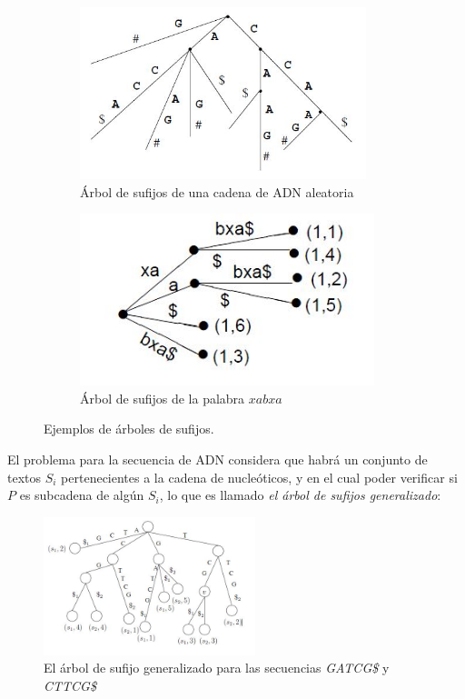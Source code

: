 \begin{figure}[h]

\begin{subfigure}{0.5\textwidth}
\includegraphics[width=0.9\linewidth, height=5cm]{./images/suffixtree1.JPG} 
\caption{Árbol de sufijos de una cadena de ADN aleatoria}
\label{fig:subim5}
\end{subfigure}
\begin{subfigure}{0.5\textwidth}
\includegraphics[width=0.9\linewidth, height=5cm]{./images/suffixtree2.JPG}
\caption{Árbol de sufijos de la palabra $xabxa$}
\label{fig:subim6}
\end{subfigure}
 
\caption{Ejemplos de árboles de sufijos.}
\label{fig:image3}
\end{figure}

El problema para la secuencia de ADN considera que habrá un conjunto de textos $S_{i}$ pertenecientes a la cadena de nucleóticos, y en el cual poder verificar si $P$ es subcadena de algún $S_{i}$, lo que es llamado {\it{el árbol de sufijos generalizado}}: 

\begin{figure}[h]
    \centering
    \includegraphics[width=0.55\textwidth]{./images/suffixtree3.JPG}
    \caption{El árbol de sufijo generalizado para las secuencias {\it{GATCG\$}} y {\it{CTTCG\$}} \cite{koaluru}}
    \label{fig:mesh1}
\end{figure}


